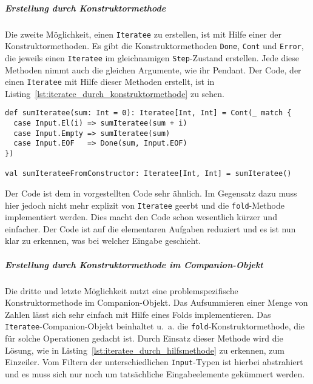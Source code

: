 \documentclass[draft=false
              ,paper=a4
              ,twoside=false
              ,fontsize=11pt
              ,headsepline
              ,BCOR10mm
              ,DIV11
              ]{scrbook}
\begin{document}
\subparagraph{Erstellung durch Konstruktormethode} %
\label{subp:erstellung_durch_konstruktormethode}\mbox{} %

Die zweite Möglichkeit, einen \lstinline|Iteratee| zu erstellen, ist mit Hilfe einer der Konstruktormethoden.
Es gibt die Konstruktormethoden \lstinline|Done|, \lstinline|Cont| und \lstinline|Error|, die jeweils einen \lstinline|Iteratee| im gleichnamigen \lstinline|Step|-Zustand erstellen.
Jede diese Methoden nimmt auch die gleichen Argumente, wie ihr Pendant.
Der Code, der einen \lstinline|Iteratee| mit Hilfe dieser Methoden erstellt, ist in Listing~\ref{lst:iteratee_durch_konstruktormethode} zu sehen.

\begin{lstlisting}[caption=Erstellung eines Iteratees durch eine Konstruktormethode, label=lst:iteratee_durch_konstruktormethode]
def sumIteratee(sum: Int = 0): Iteratee[Int, Int] = Cont(_ match {
  case Input.El(i) => sumIteratee(sum + i)
  case Input.Empty => sumIteratee(sum)
  case Input.EOF   => Done(sum, Input.EOF)
})

val sumIterateeFromConstructor: Iteratee[Int, Int] = sumIteratee()
\end{lstlisting}

Der Code ist dem in  vorgestellten Code sehr ähnlich.
Im Gegensatz dazu muss hier jedoch nicht mehr explizit von \lstinline|Iteratee| geerbt und die \lstinline|fold|-Methode implementiert werden.
Dies macht den Code schon wesentlich kürzer und einfacher.
Der Code ist auf die elementaren Aufgaben reduziert und es ist nun klar zu erkennen, was bei welcher Eingabe geschieht.


\subparagraph{Erstellung durch Konstruktormethode im Companion-Objekt} %
\label{subp:erstellung_durch_hilfsmethode}\mbox{} %

Die dritte und letzte Möglichkeit nutzt eine problemspezifische Konstruktormethode im Companion-Objekt.
Das Aufsummieren einer Menge von Zahlen lässt sich sehr einfach mit Hilfe eines Folds implementieren.
Das \lstinline|Iteratee|-Companion-Objekt beinhaltet u.~a. die \lstinline|fold|-Konstruktormethode, die für solche Operationen gedacht ist.
Durch Einsatz dieser Methode wird die Lösung, wie in Listing~\ref{lst:iteratee_durch_hilfsmethode} zu erkennen, zum Einzeiler.
Vom Filtern der unterschiedlichen \lstinline|Input|-Typen ist hierbei abstrahiert und es muss sich nur noch um tatsächliche Eingabeelemente gekümmert werden.
\end{document}
